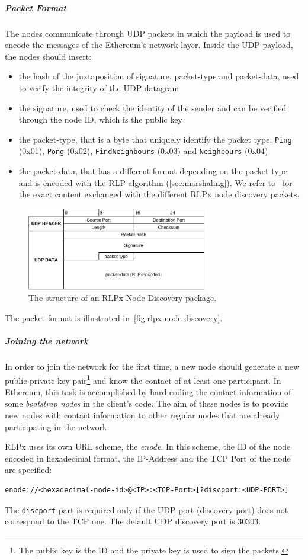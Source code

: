 \subparagraph{Packet Format}
The nodes communicate through UDP packets in which the payload is used to encode
the messages of the Ethereum's network layer. Inside the UDP payload, the nodes
should insert:
\begin{itemize}
    \item the hash of the juxtaposition of signature, packet-type and
    packet-data, used to verify the integrity of the UDP datagram
    \item the signature, used to check the identity of the sender and can be
    verified through the node ID, which is the public key
    \item the packet-type, that is a byte that uniquely identify the packet
    type: \texttt{Ping} (0x01), \texttt{Pong} (0x02), \texttt{FindNeighbours}
    (0x03) and \texttt{Neighbours} (0x04)~\cite{bib:rlpx-discovery-protocol}
    \item the packet-data, that has a different format depending on the packet
    type and is encoded with the RLP algorithm (\autoref{sec:marshaling}). We
    refer to~\cite{bib:rlpx-discovery-protocol} for the exact content exchanged
    with the different RLPx node discovery packets.
\end{itemize}
\begin{figure}
    \begin{center}
    \includegraphics[width=0.7\textwidth]{./res/img/rlp-node-discovery-packet-format.pdf}
    \caption{The structure of an RLPx Node Discovery package.}
    \label{fig:rlpx-node-discovery}
    \end{center}
\end{figure}

The packet format is illustrated in~\autoref{fig:rlpx-node-discovery}.


\subparagraph{Joining the network}
In order to join the network for the first time, a new node should generate a
new public-private key pair\footnote{The public key is the ID and the private
key is used to sign the packets.} and know the contact of at least one
participant. In Ethereum, this task is accomplished by hard-coding the contact
information of some \textit{bootstrap nodes} in the client's code. The aim of
these nodes is to provide new nodes with contact information to other regular
nodes that are already participating in the network.

RLPx uses its own URL scheme, the \emph{enode}. In this scheme, the ID of the
node encoded in hexadecimal format, the IP-Address and the TCP Port of the node
are specified:
\begin{verbatim}
enode://<hexadecimal-node-id>@<IP>:<TCP-Port>[?discport:<UDP-PORT>]
\end{verbatim}
The \verb|discport| part is required only if the UDP port (discovery port) does
not correspond to the TCP one. The default UDP discovery port is 30303.
